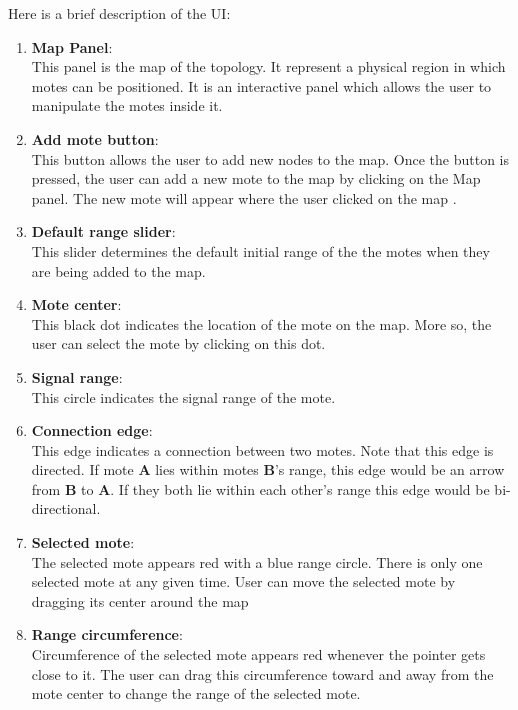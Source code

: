 \documentclass[11pt, titlepage, oneside]{article}
\begin{document}
 Here is a brief description of the UI:
\begin{enumerate} 
\item {\bf Map Panel}:\\ This panel is the map of the topology. It represent a physical region in which motes can be positioned. It is an interactive panel which allows the user to manipulate the motes inside it. 
\item {\bf Add mote button}:\\ 
This button allows the user to add new nodes to the map. Once the button is pressed, the user can add a new mote to the map by clicking on the Map panel. The new mote will appear where the user clicked on the map  .
 
\item {\bf Default range slider}:\\This slider determines the default initial range of the the motes when they are being added to the map.
 
\item {\bf Mote center}:\\ This black dot indicates the location of the mote on the map. More so, the user can select the mote by clicking on this dot. 
 
\item {\bf Signal range}:\\ This circle indicates the signal range of the mote.
 
\item {\bf Connection edge}:\\ This edge indicates a connection between two motes. Note that this edge is directed. If mote {\bf A} lies within motes {\bf B}'s range, this edge would be an arrow from {\bf B} to {\bf A}. If they both lie within each other's range this edge would be bi-directional. 
 
\item {\bf Selected mote}:\\ The selected mote appears red with a blue range circle. There is only one selected mote at any given time. User can move the selected mote by dragging its center around the map 
 
\item {\bf Range circumference}:\\ Circumference of the selected mote appears red whenever the pointer gets close to it. The user can drag this circumference toward and away from the mote center to change the range of the selected mote. 
 
\end{enumerate} 
\end{document}
